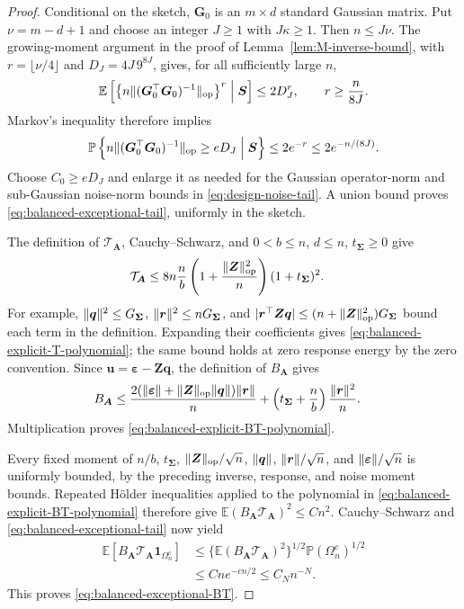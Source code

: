 \documentclass{article}
\theoremstyle{plain}
\theoremstyle{definition}
\theoremstyle{definition}
\DeclarePairedDelimiter\norm{\lVert}{\rVert}
\def\E{{\mathbb{E}}}
\def\P{{\mathbb{P}}}
\def\mathbold{\boldsymbol}
\def\cal{\mathcal}
\def\bA{\mathbold{A}}\def\calA{{\cal A}}\def\scrA{{\mathscr A}}\def\Ahat{\widehat{A}}\def\Atil{{\widetilde A}}
\def\bG{\mathbold{G}}\def\calG{{\cal G}}\def\scrG{{\mathscr G}}\def\Ghat{\widehat{G}}\def\Gtil{{\widetilde G}}
\def\bq{\mathbold{q}}\def\qhat{\widehat{q}}\def\qtil{\widetilde{q}}\def\qbar{{\overline q}}
\def\br{\mathbold{r}}\def\rhat{\widehat{r}}\def\rtil{\widetilde{r}}\def\rbar{{\overline r}}
\def\bS{\mathbold{S}}\def\hbS{{\widehat{\bS}}}\def\tbS{{\widetilde{\bS}}}
\def\bu{\mathbold{u}}\def\uhat{\widehat{u}}\def\util{\widetilde{u}}\def\ubar{{\overline u}}
\def\bZ{\mathbold{Z}}\def\hbZ{{\widehat{\bZ}}}\def\tbZ{{\widetilde{\bZ}}}
\def\ep{\varepsilon}\def\eps{\epsilon}\def\veps{\varepsilon}
\def\bep{ {\mathbold{\ep} }}
\def\bSigma{\mathbold{\Sigma}}\def\hbSigma{{\widehat{\bSigma}}}
\begin{document}
\begin{proof}
Conditional on the sketch, $\bG_0$ is an $m\times d$ standard Gaussian
matrix. Put $\nu=m-d+1$ and choose an integer $J\geq1$ with $J\kappa\geq1$.
Then $n\leq J\nu$. The growing-moment argument in the proof of
Lemma~\ref{lem:M-inverse-bound}, with
$r=\lfloor\nu/4\rfloor$ and
$D_J=4J\,9^{8J}$, gives, for all sufficiently large $n$,
\begin{align*}
    \E\left[
       \left\{n\norm{(\bG_0^\top\bG_0)^{-1}}_{\rm op}\right\}^{r}
       \mathrel{\Big|}\bS\right]
       \leq 2D_J^r,
    \qquad r\geq\frac{n}{8J}.
\end{align*}
Markov's inequality therefore implies
\begin{align*}
    \P\left\{
       n\norm{(\bG_0^\top\bG_0)^{-1}}_{\rm op}\geq eD_J
       \mathrel{\Big|}\bS\right\}
       \leq2e^{-r}\leq2e^{-n/(8J)}.
\end{align*}
Choose $C_0\geq eD_J$ and enlarge it as needed for the Gaussian operator-norm
and sub-Gaussian noise-norm bounds in \eqref{eq:design-noise-tail}.
A union bound proves \eqref{eq:balanced-exceptional-tail}, uniformly in
the sketch.

The definition of $\mathcal T_{\bA}$, Cauchy--Schwarz, and
$0<b\leq n$, $d\leq n$, $t_{\bSigma}\geq0$ give
\begin{align}
    \mathcal T_{\bA}
    &\leq 8n\frac nb
       \left(1+\frac{\norm{\bZ}_{\rm op}^2}{n}\right)
       (1+t_{\bSigma})^2.
    \label{eq:balanced-explicit-T-polynomial}
\end{align}
For example, $\norm{\bq}^2\leq G_{\bSigma}$,
$\norm{\br}^2\leq nG_{\bSigma}$, and
$|\br^\top\bZ\bq|\leq(n+\norm{\bZ}_{\rm op}^2)G_{\bSigma}$
bound each term in the definition. Expanding their coefficients gives
\eqref{eq:balanced-explicit-T-polynomial}; the same bound holds at zero
response energy by the zero convention.
Since $\bu=\bep-\bZ\bq$, the definition of $B_{\bA}$ gives
\begin{align*}
    B_{\bA}
    &\leq
       \frac{2(\norm{\bep}+\norm{\bZ}_{\rm op}\norm{\bq})\norm{\br}}{n}
       +\left(t_{\bSigma}+\frac nb\right)\frac{\norm{\br}^2}{n}.
\end{align*}
Multiplication proves \eqref{eq:balanced-explicit-BT-polynomial}.

Every fixed moment of $n/b$, $t_{\bSigma}$,
$\norm{\bZ}_{\rm op}/\sqrt n$, $\norm{\bq}$,
$\norm{\br}/\sqrt n$, and $\norm{\bep}/\sqrt n$ is uniformly bounded,
by the preceding inverse, response, and noise moment bounds.
Repeated H\"older inequalities applied to the polynomial in
\eqref{eq:balanced-explicit-BT-polynomial} therefore give
$\E(B_{\bA}\mathcal T_{\bA})^2\leq Cn^2$.
Cauchy--Schwarz and \eqref{eq:balanced-exceptional-tail} now yield
\begin{align*}
    \E\left[B_{\bA}\mathcal T_{\bA}
       \boldsymbol{1}_{\Omega_n^c}\right]
    &\leq \{\E(B_{\bA}\mathcal T_{\bA})^2\}^{1/2}
       \P(\Omega_n^c)^{1/2}\\
    &\leq Cn e^{-cn/2}\leq C_Nn^{-N}.
\end{align*}
This proves \eqref{eq:balanced-exceptional-BT}.
\end{proof}
\end{document}
